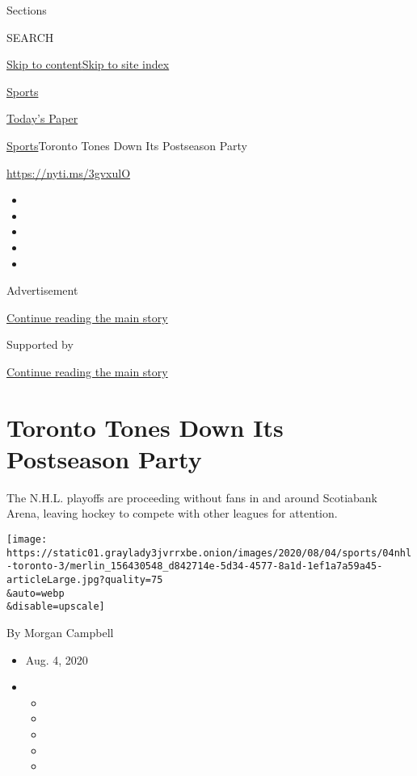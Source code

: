 Sections

SEARCH

\protect\hyperlink{site-content}{Skip to
content}\protect\hyperlink{site-index}{Skip to site index}

\href{https://www.nytimes3xbfgragh.onion/section/sports}{Sports}

\href{https://myaccount.nytimes3xbfgragh.onion/auth/login?response_type=cookie\&client_id=vi}{}

\href{https://www.nytimes3xbfgragh.onion/section/todayspaper}{Today's
Paper}

\href{/section/sports}{Sports}\textbar{}Toronto Tones Down Its
Postseason Party

\url{https://nyti.ms/3gvxulO}

\begin{itemize}
\item
\item
\item
\item
\item
\end{itemize}

Advertisement

\protect\hyperlink{after-top}{Continue reading the main story}

Supported by

\protect\hyperlink{after-sponsor}{Continue reading the main story}

\hypertarget{toronto-tones-down-its-postseason-party}{%
\section{Toronto Tones Down Its Postseason
Party}\label{toronto-tones-down-its-postseason-party}}

The N.H.L. playoffs are proceeding without fans in and around Scotiabank
Arena, leaving hockey to compete with other leagues for attention.

\texttt{[image: https://static01.graylady3jvrrxbe.onion/images/2020/08/04/sports/04nhl-toronto-3/merlin\_156430548\_d842714e-5d34-4577-8a1d-1ef1a7a59a45-articleLarge.jpg?quality=75\\\&auto=webp\\\&disable=upscale]}

By Morgan Campbell

\begin{itemize}
\item
  Aug. 4, 2020
\item
  \begin{itemize}
  \item
  \item
  \item
  \item
  \item
  \end{itemize}
\end{itemize}

